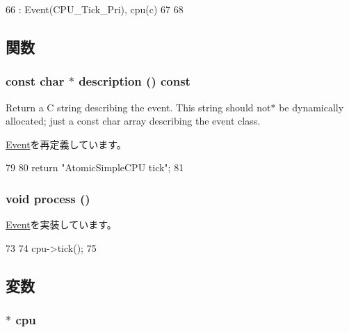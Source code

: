 \begin{DoxyCode}
66     : Event(CPU_Tick_Pri), cpu(c)
67 {
68 }
\end{DoxyCode}


\subsection{関数}
\hypertarget{structAtomicSimpleCPU_1_1TickEvent_a5a14fe478e2393ff51f02e9b7be27e00}{
\subsubsection[{description}]{\setlength{\rightskip}{0pt plus 5cm}const char $\ast$ description () const}}
\label{structAtomicSimpleCPU_1_1TickEvent_a5a14fe478e2393ff51f02e9b7be27e00}
Return a C string describing the event. This string should not$\ast$ be dynamically allocated; just a const char array describing the event class. 

\hyperlink{classEvent_a130ddddf003422b413e2e891b1b80e8f}{Event}を再定義しています。


\begin{DoxyCode}
79 {
80     return "AtomicSimpleCPU tick";
81 }
\end{DoxyCode}
\hypertarget{structAtomicSimpleCPU_1_1TickEvent_a2e9c5136d19b1a95fc427e0852deab5c}{
\subsubsection[{process}]{\setlength{\rightskip}{0pt plus 5cm}void process ()}}
\label{structAtomicSimpleCPU_1_1TickEvent_a2e9c5136d19b1a95fc427e0852deab5c}


\hyperlink{classEvent_a142b75b68a6291400e20fb0dd905b1c8}{Event}を実装しています。


\begin{DoxyCode}
73 {
74     cpu->tick();
75 }
\end{DoxyCode}


\subsection{変数}
\hypertarget{structAtomicSimpleCPU_1_1TickEvent_a9e783a4cebf1e9800f0368c175ed094f}{
\subsubsection[{cpu}]{$\ast$ {\bf cpu}}}
\label{structAtomicSimpleCPU_1_1TickEvent_a9e783a4cebf1e9800f0368c175ed094f}


